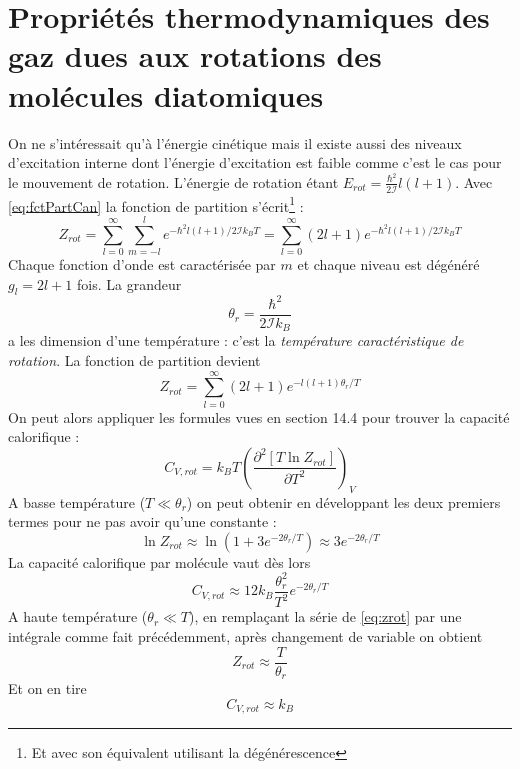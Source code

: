 \documentclass[british,french,11pt, a4paper, openany]{book}
\begin{document}
\section{Propriétés thermodynamiques des gaz dues aux rotations des molécules diatomiques}
On ne s'intéressait qu'à l'énergie cinétique mais il existe aussi des niveaux d'excitation 
interne dont l'énergie d'excitation est faible comme c'est le cas pour le mouvement de 
rotation. L'énergie de rotation étant $E_{rot} = \frac{\hbar^2}{2\mathcal{I}}l(l+1)$. Avec
\autoref{eq:fctPartCan} la fonction de partition s'écrit\footnote{Et avec son équivalent 
	utilisant la dégénérescence} :
\begin{equation}
	Z_{rot} = \sum_{l=0}^\infty\sum_{m=-l}^l e^{-\hbar^2l(l+1)/2\mathcal{I}k_BT} = \sum_{
		l=0}^\infty (2l+1)e^{-\hbar^2l(l+1)/2\mathcal{I}k_BT}
\end{equation}
Chaque fonction d'onde est caractérisée par $m$ et chaque niveau est dégénéré $g_l = 2l
+1$ fois. La grandeur
\begin{equation}
	\theta_r = \frac{\hbar^2}{2\mathcal{I}k_B}
\end{equation}
a les dimension d'une température : c'est la \textit{température caractéristique de 
	rotation}. La fonction de partition devient 
\begin{equation}
	Z_{rot} = \sum_{l=0}^\infty (2l+1)e^{-l(l+1)\theta_r/T}
	\label{eq:zrot}
\end{equation}
On peut alors appliquer les formules vues en section 14.4 pour trouver la capacité 
calorifique :
\begin{equation}
	C_{V,rot} = k_BT\left(\dfrac{\partial^2[T\ln Z_{rot}]}{\partial T^2}\right)_V
\end{equation}
A basse température ($T \ll \theta_r$) on peut obtenir en développant les deux premiers
termes pour ne pas avoir qu'une constante :
\begin{equation}
	\ln Z_{rot} \approx \ln(1+3e^{-2\theta_r/T}) \approx 3e^{-2\theta_r/T}
\end{equation}
La capacité calorifique par molécule vaut dès lors
\begin{equation}
	C_{V,rot} \approx 12 k_B \frac{\theta_r^2}{T^2}e^{-2\theta_r/T}
\end{equation}
A haute température ($\theta_r \ll T$), en remplaçant la série de \autoref{eq:zrot} par 
une intégrale comme fait précédemment, après changement de variable on obtient
\begin{equation}
	Z_{rot} \approx \frac{T}{\theta_r}
\end{equation}
Et on en tire
\begin{equation}
	C_{V,rot} \approx k_B
\end{equation}
\end{document}
